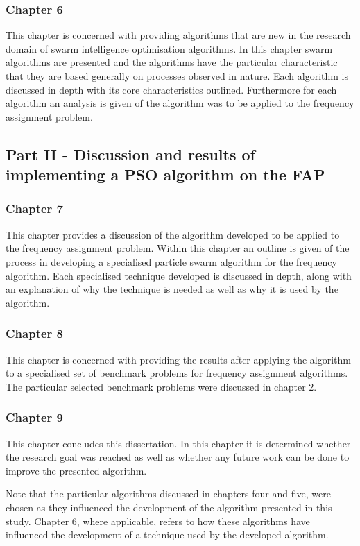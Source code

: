\subsubsection{Chapter 6}
This chapter is concerned with providing algorithms that are new in the research domain of swarm intelligence optimisation algorithms. In this chapter swarm algorithms are presented and the algorithms have the particular characteristic that they are based generally on processes observed in nature. Each algorithm is discussed in depth with its core characteristics outlined. Furthermore for each algorithm an analysis is given of the algorithm was to be applied to the frequency assignment problem.
\subsection{Part II - Discussion and results of implementing a PSO algorithm on the FAP}
\subsubsection{Chapter 7}
This chapter provides a discussion of the algorithm developed to be applied to the frequency assignment problem. Within this chapter an outline is given of the process in developing a specialised particle swarm algorithm for the frequency algorithm. Each specialised technique developed is discussed in depth, along with an explanation of why the technique is needed as well as why it is used by the algorithm.
\subsubsection{Chapter 8}
This chapter is concerned with providing the results after applying the algorithm to a specialised set of benchmark problems for frequency assignment algorithms. The particular selected benchmark problems were discussed in chapter 2.
\subsubsection{Chapter 9}
This chapter concludes this dissertation. In this chapter it is determined whether the research goal was reached as well as whether any future work can be done to improve the presented algorithm.

Note that the particular algorithms discussed in chapters four and five, were chosen as they influenced the development of the algorithm presented in this study. Chapter 6, where applicable, refers to how these algorithms have influenced the development of a technique used by the developed algorithm.
